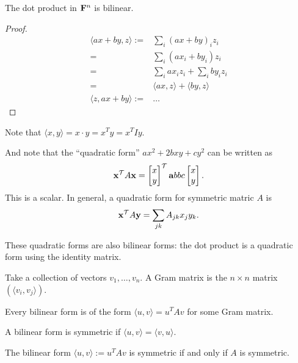 \begin{claim*}
  The dot product in $\mathbf{F}^n$ is bilinear.
\end{claim*}

\begin{proof}
  \begin{align*}
    \langle ax + by , z \rangle :=& \sum_i (ax + by)_iz_i\\
                                 =& \sum_i (ax_i + by_i)z_i\\
                                 =& \sum_i ax_iz_i + \sum_i by_iz_i\\
                                 =& \langle ax, z \rangle + \langle by, z \rangle\\
    \langle z, ax + by \rangle  :=& \ldots
  \end{align*}
\end{proof}

Note that $\langle x, y \rangle = x \cdot y = x^Ty = x^TIy$.

And note that the ``quadratic form'' $ax^2 + 2bxy + cy^2$ can be written as
\begin{align*}
\mathbf x^\mathcal T A \mathbf x = \begin{bmatrix}x\\y\end{bmatrix}^\mathcal T \mathbf{a}{b}
                                {b}{c} \begin{bmatrix}x\\y\end{bmatrix}.
\end{align*}
This is a scalar. In general, a quadratic form for symmetric matric $A$ is
\begin{align*}
\mathbf x^\mathcal T A \mathbf y = \sum_{jk}A_{jk}x_jy_k.
\end{align*}

These quadratic forms are also bilinear forms: the dot product is a quadratic form using the
identity matrix.

\begin{definition*}
  Take a collection of vectors $v_1, \ldots, v_n$. A Gram matrix is the $n \times n$ matrix
  $(\langle v_i, v_j \rangle)$.
\end{definition*}

\begin{theorem*}
  Every bilinear form is of the form $\langle u, v \rangle = u^TAv$ for some Gram matrix.
\end{theorem*}

\begin{definition*}
  A bilinear form is symmetric if $\langle u, v \rangle = \langle v, u \rangle$.
\end{definition*}

\begin{theorem*}
  The bilinear form $\langle u, v \rangle := u^TAv$ is symmetric if and only if $A$ is symmetric.
\end{theorem*}

